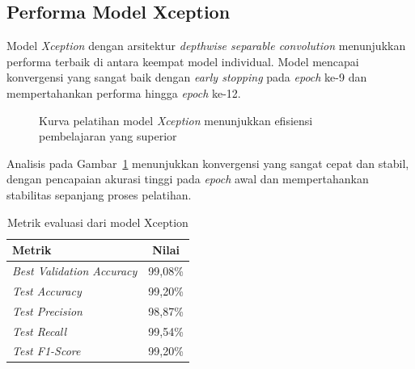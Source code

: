 \subsection{Performa Model Xception}

Model \textit{Xception} dengan arsitektur \textit{depthwise separable convolution} menunjukkan performa terbaik di antara keempat model individual. Model mencapai konvergensi yang sangat baik dengan \textit{early stopping} pada \textit{epoch} ke-9 dan mempertahankan performa hingga \textit{epoch} ke-12.

\begin{figure}[H]
    \centering
    \caption{Kurva pelatihan model \textit{Xception} menunjukkan efisiensi pembelajaran yang superior}
    \label{fig:xception_training}
\end{figure}

Analisis pada Gambar~\ref{fig:xception_training} menunjukkan konvergensi yang sangat cepat dan stabil, dengan pencapaian akurasi tinggi pada \textit{epoch} awal dan mempertahankan stabilitas sepanjang proses pelatihan.

\begin{table}[H]
\centering
\caption{Metrik evaluasi dari model Xception}
\label{tab:xception_results}
\begin{tabular}{|l|c|}
\hline
\textbf{Metrik} & \textbf{Nilai} \\
\hline
\textit{Best Validation Accuracy} & 99,08\% \\
\textit{Test Accuracy} & 99,20\% \\
\textit{Test Precision} & 98,87\% \\
\textit{Test Recall} & 99,54\% \\
\textit{Test F1-Score} & 99,20\% \\
\hline
\end{tabular}
\end{table}

